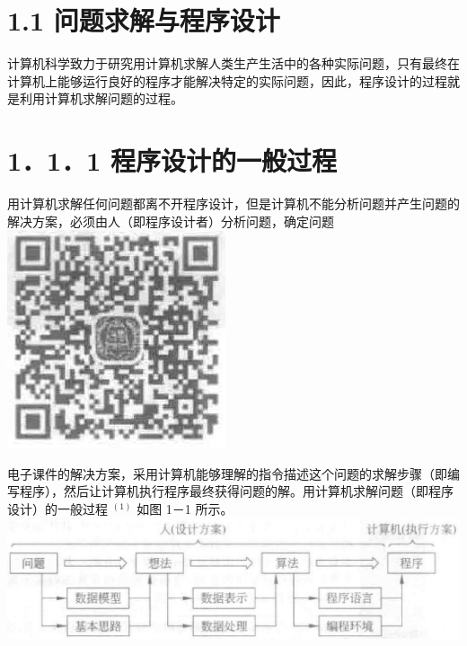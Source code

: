 \documentclass[10pt]{article}
\begin{document}
\section*{1.1 问题求解与程序设计}
计算机科学致力于研究用计算机求解人类生产生活中的各种实际问题，只有最终在计算机上能够运行良好的程序才能解决特定的实际问题，因此，程序设计的过程就是利用计算机求解问题的过程。

\section*{1．1．1 程序设计的一般过程}
用计算机求解任何问题都离不开程序设计，但是计算机不能分析问题并产生问题的解决方案，必须由人（即程序设计者）分析问题，确定问题\\
\includegraphics[max width=\textwidth, center]{2025_06_06_704745ea57b15b2333e5g-015}

电子课件的解决方案，采用计算机能够理解的指令描述这个问题的求解步骤（即编写程序），然后让计算机执行程序最终获得问题的解。用计算机求解问题（即程序设计）的一般过程 ${ }^{(1)}$ 如图 1－1 所示。\\
\includegraphics[max width=\textwidth, center]{2025_06_06_704745ea57b15b2333e5g-015(1)}
\end{document}

